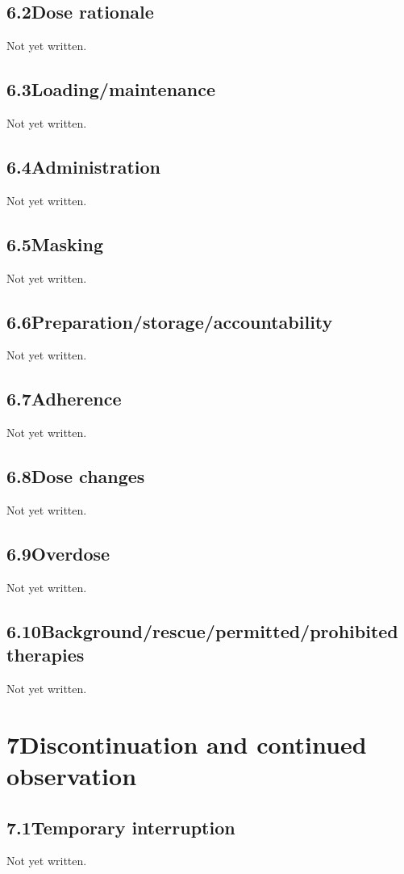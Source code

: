 \documentclass[11pt,a4paper]{article}
\newcommand{\psnote}[2]{\par\noindent\colorbox{#1!8}{\parbox{\dimexpr\linewidth-2\fboxsep}{\small\color{#1}#2}}\par}
\begin{document}
\subsection{6.2\quad Dose rationale}\label{section.6.2}
\psnote{pswarn}{Not yet written.}
\subsection{6.3\quad Loading/maintenance}\label{section.6.3}
\psnote{pswarn}{Not yet written.}
\subsection{6.4\quad Administration}\label{section.6.4}
\psnote{pswarn}{Not yet written.}
\subsection{6.5\quad Masking}\label{section.6.5}
\psnote{pswarn}{Not yet written.}
\subsection{6.6\quad Preparation/storage/accountability}\label{section.6.6}
\psnote{pswarn}{Not yet written.}
\subsection{6.7\quad Adherence}\label{section.6.7}
\psnote{pswarn}{Not yet written.}
\subsection{6.8\quad Dose changes}\label{section.6.8}
\psnote{pswarn}{Not yet written.}
\subsection{6.9\quad Overdose}\label{section.6.9}
\psnote{pswarn}{Not yet written.}
\subsection{6.10\quad Background/rescue/permitted/prohibited therapies}\label{section.6.10}
\psnote{pswarn}{Not yet written.}
\section{7\quad Discontinuation and continued observation}\label{section.7}
\subsection{7.1\quad Temporary interruption}\label{section.7.1}
\psnote{pswarn}{Not yet written.}
\end{document}
